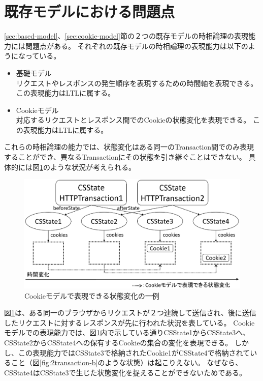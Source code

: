 \documentclass[12pt,a4paper]{jbook}
\begin{document}
\section{既存モデルにおける問題点}
\label{sec:existing-models-problems}
\ref{sec:based-model}、\ref{sec:cookie-model}節の２つの既存モデルの時相論理の表現能力には問題点がある。
それぞれの既存モデルの時相論理の表現能力は以下のようになっている。
\begin{itemize}
\item 基礎モデル \\
リクエストやレスポンスの発生順序を表現するための時間軸を表現できる。
この表現能力はLTLに属する。
\item Cookieモデル \\
対応するリクエストとレスポンス間でのCookieの状態変化を表現できる。
この表現能力はLTLに属する。
\end{itemize}
これらの時相論理の能力では、状態変化はある同一のTransaction間でのみ表現することができ、異なるTransactionにその状態を引き継ぐことはできない。
具体的には図\ref{fig:2transaction-a}のような状況が考えられる。
\begin{figure}[htb]
\centering
\includegraphics[width=450pt]{./fig/2transaction-a.eps}
\caption{Cookieモデルで表現できる状態変化の一例}
\label{fig:2transaction-a}
\end{figure}
図\ref{fig:2transaction-a}は、ある同一のブラウザからリクエストが２つ連続して送信され、後に送信したリクエストに対するレスポンスが先に行われた状況を表している。
Cookieモデルでの表現能力では、図\ref{fig:2transaction-a}内で示している通りCSState1からCSState3へ、CSState2からCSState4への保有するCookieの集合の変化を表現できる。
しかし、この表現能力ではCSState3で格納されたCookie1がCSState4で格納されていること（図\ref{fig:2transaction-b}のような状態）は起こりえない。
なぜなら、CSState4はCSState3で生じた状態変化を捉えることができないためである。
\end{document}
